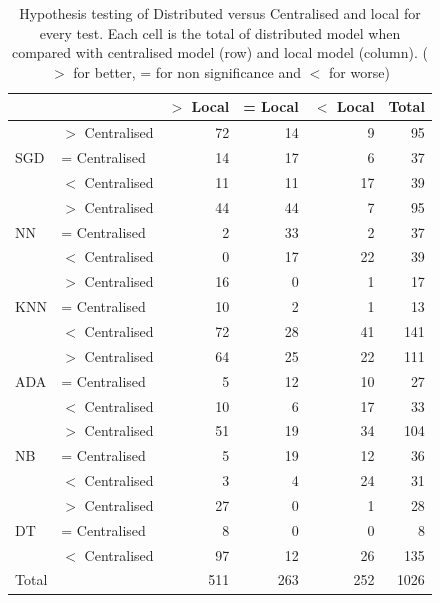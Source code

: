  \begin{table}[htbp] 
 \setlength{\tabcolsep}{6pt} %
 \renewcommand{\arraystretch}{1.1} %
  \captionsetup{justification=centering} 
\centering
\caption[Hypothesis testing of Distributed versus Centralised and local models]{Hypothesis testing of Distributed versus Centralised and local for every test. Each cell is the total of distributed model when compared with centralised model (row) and local model (column). ($>$ for better, = for non significance and $<$ for worse)}
\label{tab:hyp}
\begin{tabular}{ll|rrr|r}
\toprule

 &  & $>$ Local & = Local & $<$ Local &  Total \\


\hline \multirow[t]{3}{*}{SGD} & $>$ Centralised & 72 & 14 & 9 & 95 \\
 & =  Centralised & 14 & 17 & 6 & 37 \\
 & $<$ Centralised & 11 & 11 & 17 & 39 \\
\hline \multirow[t]{3}{*}{NN} & $>$ Centralised & 44 & 44 & 7 & 95 \\
 & =  Centralised & 2 & 33 & 2 & 37 \\
 & $<$ Centralised & 0 & 17 & 22 & 39 \\
\hline \multirow[t]{3}{*}{KNN} & $>$ Centralised & 16 & 0 & 1 & 17 \\
 & =  Centralised & 10 & 2 & 1 & 13 \\
 & $<$ Centralised & 72 & 28 & 41 & 141 \\
\hline \multirow[t]{3}{*}{ADA} & $>$ Centralised & 64 & 25 & 22 & 111 \\
 & =  Centralised & 5 & 12 & 10 & 27 \\
 & $<$ Centralised & 10 & 6 & 17 & 33 \\
\hline \multirow[t]{3}{*}{NB} & $>$ Centralised & 51 & 19 & 34 & 104 \\
 & =  Centralised & 5 & 19 & 12 & 36 \\
 & $<$ Centralised & 3 & 4 & 24 & 31 \\
\hline \multirow[t]{3}{*}{DT} & $>$ Centralised & 27 & 0 & 1 & 28 \\
 & =  Centralised & 8 & 0 & 0 & 8 \\
 & $<$ Centralised & 97 & 12 & 26 & 135 \\
 \midrule
 Total &  & 511 & 263 & 252 & 1026 \\
 \bottomrule
\end{tabular}
\end{table}









